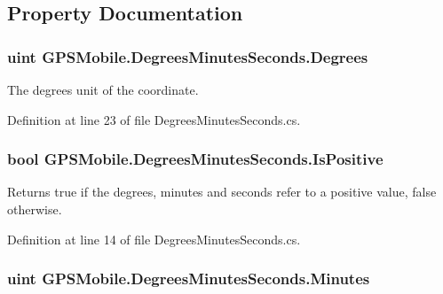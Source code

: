 \subsection{Property Documentation}
\hypertarget{class_g_p_s_mobile_1_1_degrees_minutes_seconds_ae24ec91d5cae1b7bb197b8a9ce319965}{
\subsubsection[{Degrees}]{\setlength{\rightskip}{0pt plus 5cm}uint GPSMobile.DegreesMinutesSeconds.Degrees}}
\label{class_g_p_s_mobile_1_1_degrees_minutes_seconds_ae24ec91d5cae1b7bb197b8a9ce319965}


The degrees unit of the coordinate. 

Definition at line 23 of file DegreesMinutesSeconds.cs.\hypertarget{class_g_p_s_mobile_1_1_degrees_minutes_seconds_a14812fc58ea812f0a28b20447f2e32cc}{
\subsubsection[{IsPositive}]{\setlength{\rightskip}{0pt plus 5cm}bool GPSMobile.DegreesMinutesSeconds.IsPositive}}
\label{class_g_p_s_mobile_1_1_degrees_minutes_seconds_a14812fc58ea812f0a28b20447f2e32cc}


Returns true if the degrees, minutes and seconds refer to a positive value, false otherwise. 

Definition at line 14 of file DegreesMinutesSeconds.cs.\hypertarget{class_g_p_s_mobile_1_1_degrees_minutes_seconds_a186a923e69d06147fa4682300c47ae71}{
\subsubsection[{Minutes}]{\setlength{\rightskip}{0pt plus 5cm}uint GPSMobile.DegreesMinutesSeconds.Minutes}}
\label{class_g_p_s_mobile_1_1_degrees_minutes_seconds_a186a923e69d06147fa4682300c47ae71}



